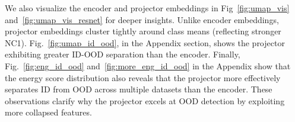 
We also visualize the encoder and projector embeddings in Fig~\ref{fig:umap_vis} and~\ref{fig:umap_vis_resnet} for deeper insights. Unlike encoder embeddings, projector embeddings cluster tightly around class means (reflecting stronger NC1).
Fig.~\ref{fig:umap_id_ood}, in the Appendix section, shows the projector exhibiting greater ID-OOD separation than the encoder. Finally, Fig.~\ref{fig:eng_id_ood} and~\ref{fig:more_eng_id_ood} in the Appendix show that the energy score distribution also reveals that the projector more effectively separates ID from OOD across multiple datasets than the encoder. These observations clarify why the projector excels at OOD detection by exploiting more collapsed features.


